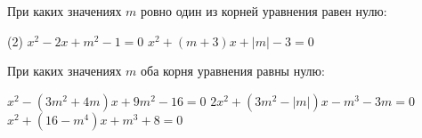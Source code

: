 \begin{consultation}
	\begin{listofex}
		\item При каких значениях \(m\) ровно один из корней уравнения равен нулю:
		\begin{tasks}(2)
			\task \( x^2-2x+m^2-1=0 \)
			\task \( x^2+(m+3)x+|m|-3=0 \)
		\end{tasks}
		\item При каких значениях \(m\) оба корня уравнения равны нулю:
		\begin{tasks}
			\task \( x^2-(3m^2+4m)x+9m^2-16=0 \)
			\task \( 2x^2+(3m^2-|m|)x-m^3-3m=0 \)
			\task \( x^2+(16-m^4)x+m^3+8=0 \)
		\end{tasks}
		
	\end{listofex}
\end{consultation}


